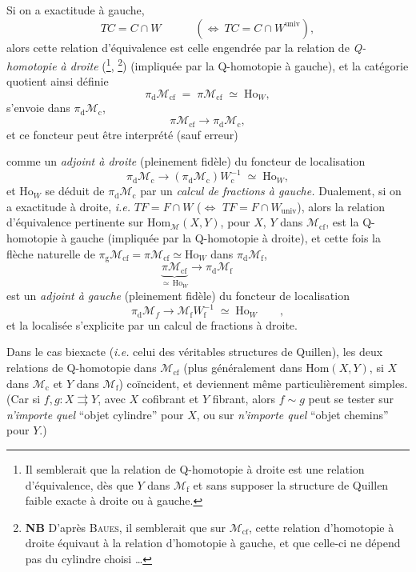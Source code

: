 \documentclass[11pt]{article}
\newcommand{\printedpage}[1]{\marginpar{\footnotesize p.~#1}}
\newcommand{\msp}[1]{\marginpar{\footnotesize [#1]}}
\newcommand{\cM}{\mathcal{M}}
\newcommand{\univ}{\mathrm{univ}}
\begin{document}
Si on a exactitude à gauche,
\[
TC = C \cap W \qquad\quad (\Longleftrightarrow\ TC = C \cap W^{\univ}),
\]
alors cette relation d'équivalence est celle engendrée par la relation de \textit{Q-homotopie à droite} (\footnote[22]{Il semblerait que la relation de Q-homotopie à droite est une relation d'équivalence, dès que $Y$ dans $\mathcal{M}_{\mathrm{f}}$ et sans supposer la structure de Quillen faible exacte à droite ou à gauche.}, \footnote[23]{\textbf{NB} D'après \textsc{Baues}, il semblerait que sur $\mathcal{M}_{\mathrm{cf}}$, cette relation d'homotopie à droite équivaut à la relation d'homotopie à gauche, et que celle-ci ne dépend pas du cylindre choisi \ldots}) (impliquée par la Q-homotopie à gauche), et la catégorie quotient ainsi définie
\[
\pi_{\mathrm{d}}\mathcal{M}_{\mathrm{cf}} \;=\; \pi\mathcal{M}_{\mathrm{cf}} \;\simeq\; \mathrm{Ho}_W,
\]
s'envoie dans $\pi_{\mathrm{d}}\mathcal{M}_{\mathrm{c}}$,
\[
\pi\mathcal{M}_{\mathrm{cf}} \longrightarrow \pi_{\mathrm{d}}\mathcal{M}_{\mathrm{c}},
\]
et ce foncteur peut être interprété (sauf erreur)

\setcounter{footnote}{23}

\printedpage{19}
\msp{page 31}
comme un \textit{adjoint à droite} (pleinement fidèle) du foncteur de localisation
\[
\pi_{\mathrm{d}}\cM_{\mathrm{c}} \longrightarrow (\pi_{\mathrm{d}}\cM_{\mathrm{c}})W_{\mathrm{c}}^{-1} \;\simeq\; \mathrm{Ho}_W,
\]
et $\mathrm{Ho}_W$ se déduit de $\pi_{\mathrm{d}}\cM_{\mathrm{c}}$ par un \textit{calcul de fractions à gauche.} Dualement, si on a exactitude à droite, \textit{i.e.} $TF = F\cap W$ ($\Longleftrightarrow$ $TF = F\cap W_{\mathrm{univ}}$), alors la relation d'équivalence pertinente sur $\mathrm{Hom}_{\cM}(X,Y)$, pour $X$, $Y$ dans $\cM_{\mathrm{cf}}$, est la Q-homotopie à gauche (impliquée par la Q-homotopie à droite), et cette fois la flèche naturelle de $\pi_{\mathrm{g}}\cM_{\mathrm{cf}} = \pi\cM_{\mathrm{cf}} \simeq \mathrm{Ho}_W$ dans $\pi_{\mathrm{d}}\cM_{\mathrm{f}}$,
\[
\underbrace{\pi\cM_{\mathrm{cf}}}_{\simeq\,\mathrm{Ho}_W} \longrightarrow \pi_{\mathrm{d}}\cM_{\mathrm{f}} \qquad
\]
est un \textit{adjoint à gauche} (pleinement fidèle) du foncteur de localisation
\[
\pi_{\mathrm{d}}\cM_f \longrightarrow \cM_{\mathrm{f}}W_{\mathrm{f}}^{-1} \;\simeq\; \mathrm{Ho}_W \qquad, %
\]
et la localisée s'explicite par un calcul de fractions à droite.

Dans le cas biexacte (\textit{i.e.} celui des véritables structures de Quillen), les deux relations de Q-homotopie dans $\cM_{\mathrm{cf}}$ (plus généralement dans $\mathrm{Hom}(X,Y)$, si $X$ dans $\cM_{\mathrm{c}}$ et $Y$ dans $\cM_{\mathrm{f}}$)
\msp{page 32}
coïncident, et deviennent même particulièrement simples. (Car si $f, g : X \rightrightarrows Y$, avec $X$ cofibrant et $Y$ fibrant, alors $f\sim g$ peut se tester sur \textit{n'importe quel} “objet cylindre” pour $X$, ou sur \textit{n'importe quel} “objet chemins” pour $Y$.)
\end{document}
